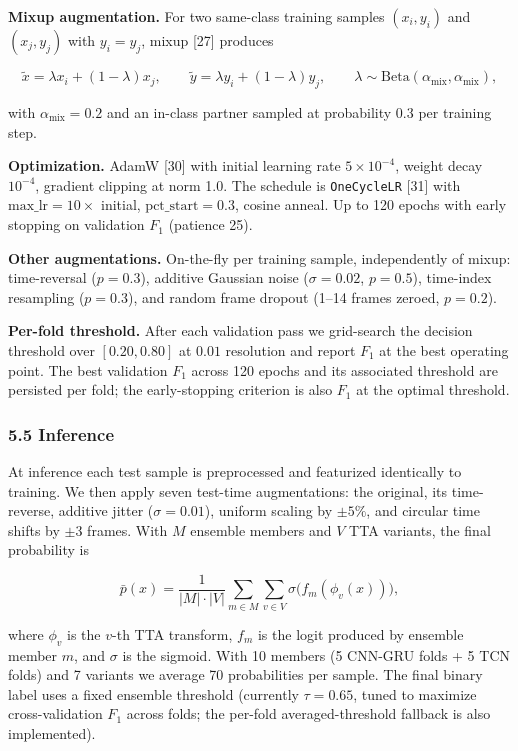 \documentclass[
  11pt,
]{article}
\begin{document}
\textbf{Mixup augmentation.} For two same-class training samples
\((x_i, y_i)\) and \((x_j, y_j)\) with \(y_i = y_j\), mixup {[}27{]}
produces

\[\tilde x = \lambda x_i + (1-\lambda) x_j, \qquad \tilde y = \lambda y_i + (1-\lambda) y_j, \qquad \lambda \sim \mathrm{Beta}(\alpha_{\text{mix}}, \alpha_{\text{mix}}),\]

with \(\alpha_{\text{mix}} = 0.2\) and an in-class partner sampled at
probability 0.3 per training step.

\textbf{Optimization.} AdamW {[}30{]} with initial learning rate
\(5\times 10^{-4}\), weight decay \(10^{-4}\), gradient clipping at norm
1.0. The schedule is \texttt{OneCycleLR} {[}31{]} with
\(\text{max\_lr} = 10\times\) initial, \(\text{pct\_start} = 0.3\),
cosine anneal. Up to 120 epochs with early stopping on validation
\(F_1\) (patience 25).

\textbf{Other augmentations.} On-the-fly per training sample,
independently of mixup: time-reversal (\(p{=}0.3\)), additive Gaussian
noise (\(\sigma{=}0.02\), \(p{=}0.5\)), time-index resampling
(\(p{=}0.3\)), and random frame dropout (1--14 frames zeroed,
\(p{=}0.2\)).

\textbf{Per-fold threshold.} After each validation pass we grid-search
the decision threshold over \([0.20, 0.80]\) at \(0.01\) resolution and
report \(F_1\) at the best operating point. The best validation \(F_1\)
across 120 epochs and its associated threshold are persisted per fold;
the early-stopping criterion is also \(F_1\) at the optimal threshold.

\subsubsection{5.5 Inference}\label{inference}

At inference each test sample is preprocessed and featurized identically
to training. We then apply seven test-time augmentations: the original,
its time-reverse, additive jitter (\(\sigma{=}0.01\)), uniform scaling
by \(\pm 5\%\), and circular time shifts by \(\pm 3\) frames. With \(M\)
ensemble members and \(V\) TTA variants, the final probability is

\[\bar p(x) = \frac{1}{|M| \cdot |V|} \sum_{m \in M} \sum_{v \in V} \sigma\bigl(f_m(\phi_v(x))\bigr),\]

where \(\phi_v\) is the \(v\)-th TTA transform, \(f_m\) is the logit
produced by ensemble member \(m\), and \(\sigma\) is the sigmoid. With
10 members (5 CNN-GRU folds + 5 TCN folds) and 7 variants we average 70
probabilities per sample. The final binary label uses a fixed ensemble
threshold (currently \(\tau = 0.65\), tuned to maximize cross-validation
\(F_1\) across folds; the per-fold averaged-threshold fallback is also
implemented).
\end{document}
